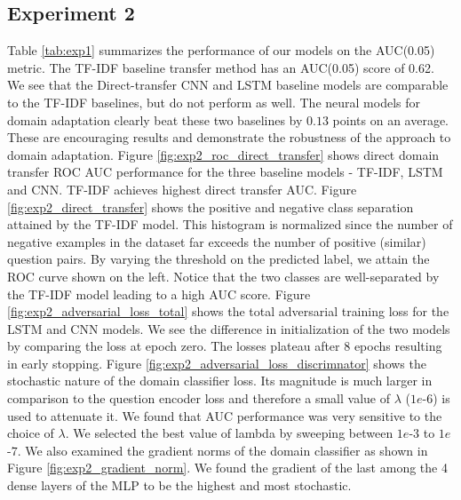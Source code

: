 \documentclass{sigkddExp}
\begin{document}
\subsection{Experiment 2}
Table \ref{tab:exp1} summarizes the performance of our models on the AUC(0.05) metric. The TF-IDF baseline transfer method has an AUC(0.05) score of 0.62. We see that the Direct-transfer CNN and LSTM baseline models are comparable to the TF-IDF baselines, but do not perform as well. The neural models for domain adaptation clearly beat these two baselines by $0.13$ points on an average. These are encouraging results and demonstrate the robustness of the approach to domain adaptation.
Figure \ref{fig:exp2_roc_direct_transfer} shows direct domain transfer ROC AUC performance for the three baseline models - TF-IDF, LSTM and CNN. TF-IDF achieves highest direct transfer AUC. Figure \ref{fig:exp2_direct_transfer} shows the positive and negative class separation attained by the TF-IDF model. This histogram is normalized since the number of negative examples in the dataset far exceeds the number of positive (similar) question pairs. By varying the threshold on the predicted label, we attain the ROC curve shown on the left. Notice that the two classes are well-separated by the TF-IDF model leading to a high AUC score. Figure \ref{fig:exp2_adversarial_loss_total} shows the total adversarial training loss for the LSTM and CNN models. We see the difference in initialization of the two models by comparing the loss at epoch zero. The losses plateau after 8 epochs resulting in early stopping. Figure \ref{fig:exp2_adversarial_loss_discrimnator} shows the stochastic nature of the domain classifier loss. Its magnitude is much larger in comparison to the question encoder loss and therefore a small value of $\lambda$ ($1e$-$6$) is used to attenuate it. We found that AUC performance was very sensitive to the choice of $\lambda$. We selected the best value of lambda by sweeping between $1e$-$3$ to $1e$-$7$. We also examined the gradient norms of the domain classifier as shown in Figure \ref{fig:exp2_gradient_norm}. We found the gradient of the last among the 4 dense layers of the MLP to be the highest and most stochastic.
\end{document}
